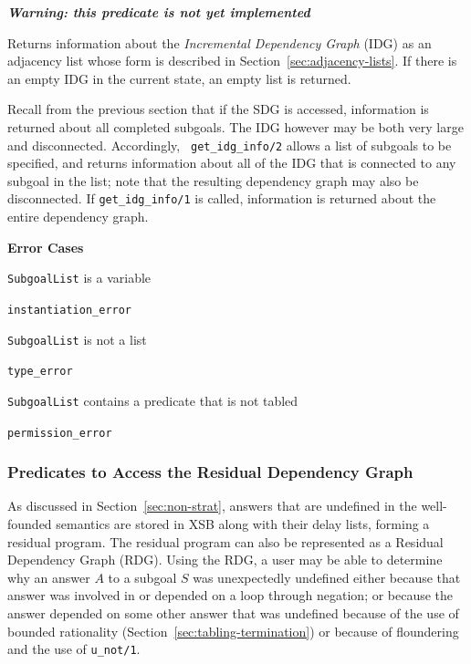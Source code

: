 \begin{description}
%

{\bf {\em Warning: this predicate is not yet implemented}}

Returns information about the {\em Incremental Dependency Graph} (IDG)
as an adjacency list whose form is described in Section~\ref{sec:adjacency-lists}.
%
If there is an empty IDG in the current state, an empty list
is returned.

Recall from the previous section that if the SDG is accessed,
information is returned about all completed subgoals.  The IDG however
may be both very large and disconnected.  Accordingly, {\tt
  get\_idg\_info/2} allows a list of subgoals to be specified, and
returns information about all of the IDG that is connected to any
subgoal in the list; note that the resulting dependency graph may also
be disconnected.  If {\tt get\_idg\_info/1} is called, information is
returned about the entire dependency graph.

{\bf Error Cases}
\bi
\item {\tt SubgoalList} is a variable
\bi
\item 	{\tt instantiation\_error}
\ei
\item {\tt SubgoalList} is not a list
\bi
\item 	{\tt type\_error}
\ei
\item {\tt SubgoalList} contains a predicate that is not tabled
\bi
\item 	{\tt permission\_error}
\ei
\ei
\end{description}

\subsubsection{Predicates to Access the Residual Dependency Graph} \label{sec:rdg-preds}

As discussed in Section~\ref{sec:non-strat}, answers that are
undefined in the well-founded semantics are stored in XSB along with
their delay lists, forming a residual program.  The residual program
can also be represented as a Residual Dependency Graph (RDG).  Using
the RDG, a user may be able to determine why an answer $A$ to a
subgoal $S$ was unexpectedly undefined either because that answer was
involved in or depended on a loop through negation; or because the
answer depended on some other answer that was undefined because of the
use of bounded rationality (Section~\ref{sec:tabling-termination}) or
because of floundering and the use of {\tt u\_not/1}.


